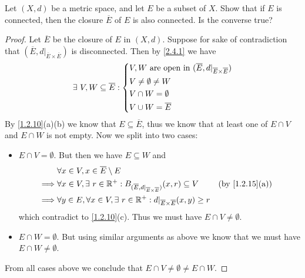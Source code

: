\begin{ex}\label{ex:2.4.8}
  Let \((X, d)\) be a metric space, and let \(E\) be a subset of \(X\).
  Show that if \(E\) is connected, then the closure \(\overline{E}\) of \(E\) is also connected.
  Is the converse true?
\end{ex}

\begin{proof}
  Let \(\overline{E}\) be the closure of \(E\) in \((X, d)\).
  Suppose for sake of contradiction that \((\overline{E}, d|_{\overline{E} \times \overline{E}})\) is disconnected.
  Then by \cref{2.4.1} we have
  \[
    \exists\ V, W \subseteq \overline{E} : \begin{dcases}
      V, W \text{ are open in } (\overline{E}, d|_{\overline{E} \times \overline{E}}) \\
      V \neq \emptyset \neq W                                                         \\
      V \cap W = \emptyset                                                            \\
      V \cup W = \overline{E}
    \end{dcases}
  \]
  By \cref{1.2.10}(a)(b) we know that \(E \subseteq \overline{E}\), thus we know that at least one of \(E \cap V\) and \(E \cap W\) is not empty.
  Now we split into two cases:
  \begin{itemize}
    \item \(E \cap V = \emptyset\).
          But then we have \(E \subseteq W\) and
          \begin{align*}
                     & \forall x \in V, x \in \overline{E} \setminus E                                                                                                      \\
            \implies & \forall x \in V, \exists\ r \in \R^+ : B_{(\overline{E}, d|_{\overline{E} \times \overline{E}})}(x, r) \subseteq V &  & \text{(by \cref{1.2.15}(a))} \\
            \implies & \forall y \in E, \forall x \in V, \exists\ r \in \R^+ : d|_{\overline{E} \times \overline{E}}(x, y) \geq r
          \end{align*}
          which contradict to \cref{1.2.10}(c).
          Thus we must have \(E \cap V \neq \emptyset\).
    \item \(E \cap W = \emptyset\).
          But using similar arguments as above we know that we must have \(E \cap W \neq \emptyset\).
  \end{itemize}
  From all cases above we conclude that \(E \cap V \neq \emptyset \neq E \cap W\).

\end{proof}
